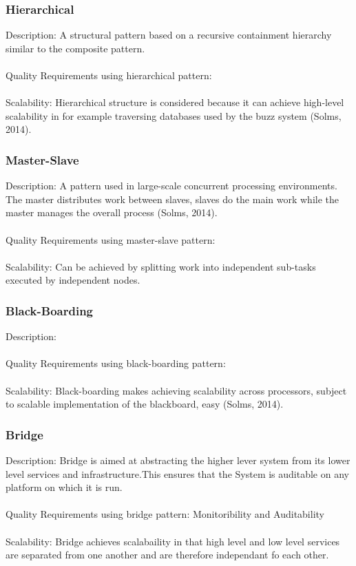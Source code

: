 \subsubsection{Hierarchical}
Description: A structural pattern based on a recursive containment hierarchy similar to the composite pattern.\\
\\
Quality Requirements using hierarchical pattern:\\
\\
Scalability: Hierarchical structure is considered because it can achieve high-level scalability in for example traversing databases used by the buzz system (Solms, 2014).\\
\subsubsection{Master-Slave}
Description: A pattern used in large-scale concurrent processing environments. The master distributes work between slaves, slaves do the main work while the master manages the  overall process (Solms, 2014). \\
\\
Quality Requirements using master-slave pattern:\\
\\
Scalability: Can be achieved by splitting work into independent sub-tasks executed by independent nodes.\\
\subsubsection{Black-Boarding}
Description:\\
\\
Quality Requirements using black-boarding pattern:\\
\\
Scalability: Black-boarding makes achieving scalability across processors, subject to scalable implementation of the blackboard, easy (Solms, 2014).\\ 
\subsubsection{Bridge}
Description: Bridge is aimed at abstracting the higher lever system from its lower level services and infrastructure.This ensures that the System is auditable on any platform on which it is run.\\
\\
Quality Requirements using bridge pattern: Monitoribility and Auditability\\
\\
Scalability: Bridge achieves scalabaility in that high level and low level services are separated from one another and are therefore independant fo each other.\\

